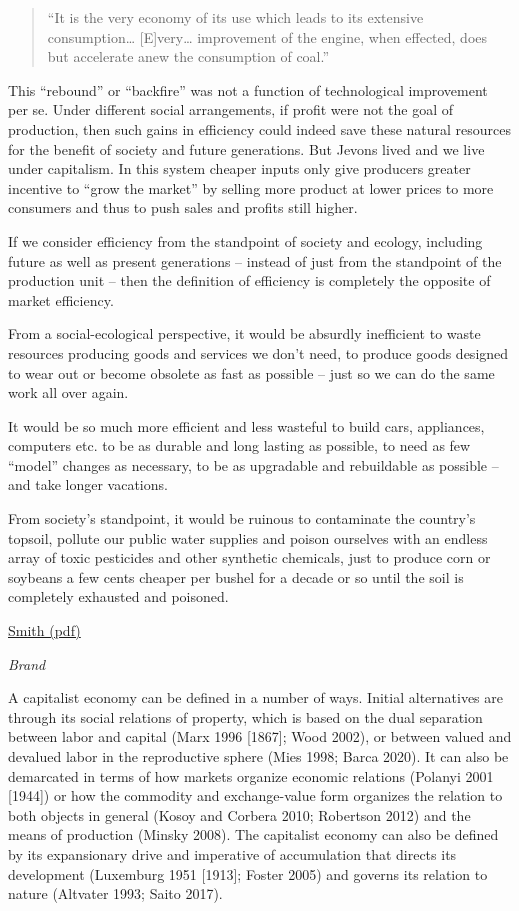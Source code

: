 \documentclass[
]{book}
\begin{document}
\begin{quote}
``It is the very economy of its use which leads to its extensive
consumption\ldots{} {[}E{]}very\ldots{} improvement of the engine, when
effected, does but accelerate anew the consumption of coal.''
\end{quote}

This ``rebound'' or ``backfire'' was not a function of technological improvement per
se. Under different social arrangements, if profit were not the goal of production,
then such gains in efficiency could indeed save these natural resources for the
benefit of society and future generations. But Jevons lived and we live under
capitalism. In this system cheaper inputs only give producers greater incentive to
``grow the market'' by selling more product at lower prices to more consumers and
thus to push sales and profits still higher.

If we consider efficiency from the standpoint of society and ecology, including
future as well as present generations -- instead of just from the standpoint of the
production unit -- then the definition of efficiency is completely the opposite of
market efficiency.

From a social-ecological perspective, it would be absurdly
inefficient to waste resources producing goods and services we don't need, to
produce goods designed to wear out or become obsolete as fast as possible -- just so
we can do the same work all over again.

It would be
so much more efficient and less wasteful to build cars, appliances, computers etc. to
be as durable and long lasting as possible, to need as few ``model'' changes as
necessary, to be as upgradable and rebuildable as possible -- and take longer
vacations.

From society's standpoint, it would be
ruinous to contaminate the country's topsoil, pollute our public water supplies and
poison ourselves with an endless array of toxic pesticides and other synthetic
chemicals, just to produce corn or soybeans a few cents cheaper per bushel for a
decade or so until the soil is completely exhausted and poisoned.

\href{pdf/Richard_Smith_Green_Capitalism_the_God_that_Failed.pdf}{Smith (pdf)}

\emph{Brand}

A capitalist economy can be defined in a number of ways. Initial alternatives are through its social relations of property, which is based on the dual separation between labor and capital (Marx 1996 {[}1867{]}; Wood 2002), or between valued and devalued labor in the reproductive sphere (Mies 1998; Barca 2020). It can also be demarcated in terms of how markets organize economic relations (Polanyi 2001 {[}1944{]}) or how the commodity and exchange-value form organizes the relation to both objects in general (Kosoy and Corbera 2010; Robertson 2012) and the means of production (Minsky 2008). The capitalist economy can also be defined by its expansionary drive and imperative of accumulation that directs its development (Luxemburg 1951 {[}1913{]}; Foster 2005) and governs its relation to nature (Altvater 1993; Saito 2017).
\end{document}
